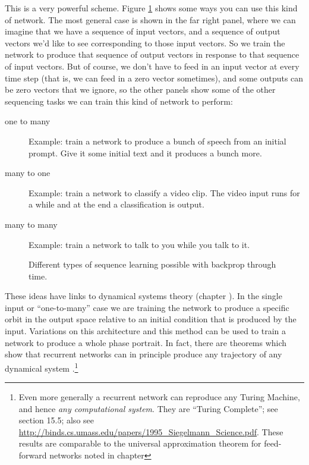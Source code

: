 This is a very powerful scheme. Figure \ref{rnn_schema} shows some ways you can use this kind of network. The most general case is shown in the far right panel, where we can imagine that we have a sequence of input vectors, and a sequence of output vectors we'd like to see corresponding to those input vectors. So we train the network to produce that sequence of output vectors in response to that  sequence of input vectors. But of course, we don't have to feed in an input vector at every time step (that is, we can feed in a zero vector sometimes), and  some outputs can be zero vectors that we ignore, so the other panels show some of the other sequencing tasks we can train this kind of network to perform:
\begin{description}
\item[one to many] Example: train a network to produce a bunch of speech from an initial prompt. Give it some initial text and it produces a bunch more.
\item[many to one] Example: train a network to classify a video clip. The video input runs for a while and at the end a classification is output.
\item[many to many] Example: train a network to talk to you while you talk to it.
\end{description}

\begin{figure}[h]
\centering
{}
\caption[From Karpathy, 2015 \cite{karpathy2015unreasonable}.]{Different types of sequence learning possible with backprop through time. }
\label{rnn_schema}
\end{figure}

These ideas have links to dynamical systems theory (chapter ). In the single input or ``one-to-many'' case we are training the network to produce a specific orbit in the output space relative to an initial condition that is produced by the input. Variations on this architecture and this method can be used to train a network to produce a whole phase portrait. In fact, there are theorems which show that recurrent networks can in principle produce any trajectory of any dynamical system \cite{funahashi1993approximation}.\footnote{Even more generally a recurrent network can reproduce any Turing Machine, and hence \emph{any computational system}. They are ``Turing Complete''; see \cite{haykin1998neural} section 15.5; also see  \url{http://binds.cs.umass.edu/papers/1995_Siegelmann_Science.pdf}. These results are comparable to the universal approximation theorem for feed-forward networks noted in chapter } 

